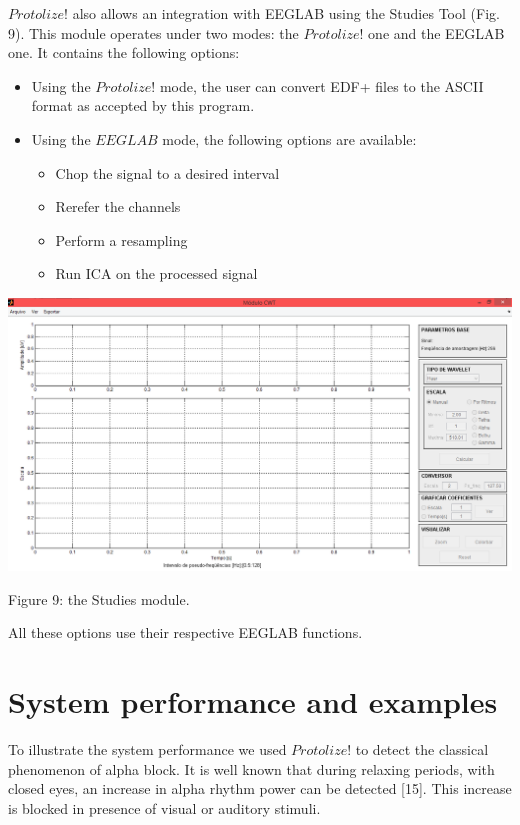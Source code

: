 \documentclass[12pt, a4paper]{article}
\begin{document}
$Protolize!$ also allows an integration with EEGLAB using the Studies Tool (Fig. 9). This module operates under two modes: the $Protolize!$ one and the EEGLAB one. It contains the following options:
\begin{itemize}
\item Using the $Protolize!$ mode, the user can convert EDF+ files to the ASCII format as accepted by this program.
\item Using the $EEGLAB$ mode, the following options are available:
    \begin{itemize}
    \item Chop the signal to a desired interval
    \item Rerefer the channels
    \item Perform a resampling
    \item Run ICA on the processed signal
    \end{itemize}
\end{itemize}
\begin{center}
\includegraphics[width=15cm]{cwt.png}

Figure 9: the Studies module.
\end{center}

All these options use their respective EEGLAB functions.

\section{System performance and examples}

To illustrate the system performance we used $Protolize!$ to detect the classical phenomenon of alpha block.  It is well known that during relaxing periods, with closed eyes, an increase in alpha rhythm power can be detected [15]. This increase is blocked in presence of visual or auditory stimuli.
\end{document}
